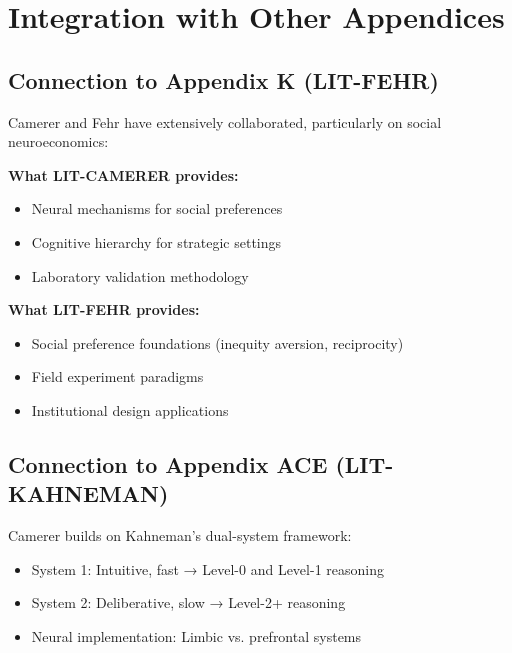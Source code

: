 \section{Integration with Other Appendices}
\label{sec:ca-integration}

\subsection{Connection to Appendix K (LIT-FEHR)}

Camerer and Fehr have extensively collaborated, particularly on social neuroeconomics:

\begin{tcolorbox}[colback=yellow!5!white, colframe=yellow!75!black,
    title=Integration: LIT-CAMERER $\leftrightarrow$ LIT-FEHR]
\textbf{What LIT-CAMERER provides:}
\begin{itemize}[nosep]
\item Neural mechanisms for social preferences
\item Cognitive hierarchy for strategic settings
\item Laboratory validation methodology
\end{itemize}

\textbf{What LIT-FEHR provides:}
\begin{itemize}[nosep]
\item Social preference foundations (inequity aversion, reciprocity)
\item Field experiment paradigms
\item Institutional design applications
\end{itemize}
\end{tcolorbox}

\subsection{Connection to Appendix ACE (LIT-KAHNEMAN)}

Camerer builds on Kahneman's dual-system framework:

\begin{itemize}[nosep]
\item System 1: Intuitive, fast → Level-0 and Level-1 reasoning
\item System 2: Deliberative, slow → Level-2+ reasoning
\item Neural implementation: Limbic vs. prefrontal systems
\end{itemize}

